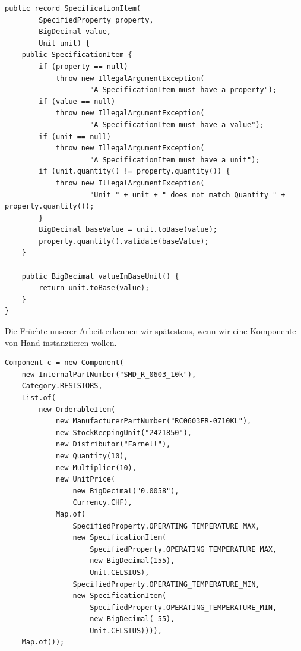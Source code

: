 \begin{listing}[H]
\begin{verbatim}
public record SpecificationItem(
        SpecifiedProperty property,
        BigDecimal value,
        Unit unit) {
    public SpecificationItem {
        if (property == null)
            throw new IllegalArgumentException(
                    "A SpecificationItem must have a property");
        if (value == null)
            throw new IllegalArgumentException(
                    "A SpecificationItem must have a value");
        if (unit == null)
            throw new IllegalArgumentException(
                    "A SpecificationItem must have a unit");
        if (unit.quantity() != property.quantity()) {
            throw new IllegalArgumentException(
                    "Unit " + unit + " does not match Quantity " + property.quantity());
        }
        BigDecimal baseValue = unit.toBase(value);
        property.quantity().validate(baseValue);
    }

    public BigDecimal valueInBaseUnit() {
        return unit.toBase(value);
    }
}
\end{verbatim}
\caption{Implementierung des SepcificationItem-Record inkl. Validierung}
\label{lst:SpecifiedPropertyEnumWithValidation}
\end{listing}

Die Früchte unserer Arbeit erkennen wir spätestens, wenn wir eine Komponente
von Hand instanziieren wollen.

\begin{listing}[H]
\begin{verbatim}
Component c = new Component(
    new InternalPartNumber("SMD_R_0603_10k"),
    Category.RESISTORS,
    List.of(
        new OrderableItem(
            new ManufacturerPartNumber("RC0603FR-0710KL"),
            new StockKeepingUnit("2421850"),
            new Distributor("Farnell"),
            new Quantity(10),
            new Multiplier(10),
            new UnitPrice(
                new BigDecimal("0.0058"),
                Currency.CHF),
            Map.of(
                SpecifiedProperty.OPERATING_TEMPERATURE_MAX,
                new SpecificationItem(
                    SpecifiedProperty.OPERATING_TEMPERATURE_MAX,
                    new BigDecimal(155), 
                    Unit.CELSIUS),
                SpecifiedProperty.OPERATING_TEMPERATURE_MIN,
                new SpecificationItem(
                    SpecifiedProperty.OPERATING_TEMPERATURE_MIN,
                    new BigDecimal(-55), 
                    Unit.CELSIUS)))),
    Map.of());

\end{verbatim}
\caption{Manuelle Instanziierung einer Komponente}
\label{lst:manualComponentInstantiation}
\end{listing}


